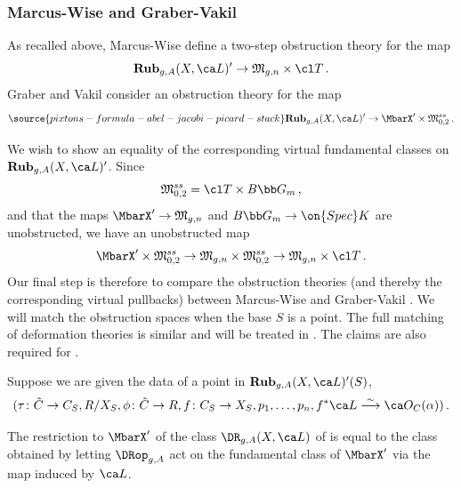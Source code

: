 \subsubsection{Marcus-Wise and Graber-Vakil}\label{mwgv}


As recalled above, Marcus-Wise define a two-step obstruction theory for the map
\begin{equation*}
\cat{Rub}_{g,A}(X, \ca L)' \to \frak M_{g,n} \times \cl T\,.
\end{equation*}
Graber and Vakil consider an obstruction theory for the map
\begin{equation} \label{vrrt}
\source{pixtons-formula-abel-jacobi-picard-stack}
\cat{Rub}_{g,A}(X, \ca L)' \to \MbarX' \times \frak M_{0,2}^{ss}\, .
\end{equation}

We wish to show an equality of the corresponding virtual fundamental classes on $\cat{Rub}_{g,A}(X, \ca L)'$. Since $$\frak M_{0,2}^{ss} = \cl T \times B\bb G_m\, ,$$ and that the maps $\MbarX' \to \frak M_{g,n}$ and $B \bb G_m \to \on{Spec} \field$ are unobstructed, we have an unobstructed map
$$ \MbarX' \times \frak M_{0,2}^{ss} \to \frak M_{g,n} \times \frak M_{0,2}^{ss} \to \frak M_{g,n} \times \cl T\, .$$
Our final step is therefore to compare the obstruction theories (and thereby the corresponding virtual pullbacks) between Marcus-Wise and Graber-Vakil \cite{Graber2005Relative-virtua,Li2002A-degeneration}.
We will match the obstruction spaces when the base $S$ is a point.
The full matching of deformation theories is similar and will be treated in \cite{PW}.
The claims are also required for \cite{Marcus2017Logarithmic-com}.

Suppose we are given the data of a point in $\cat{Rub}_{g,A}(X, \ca L)'(S)$,
\begin{equation}
(\tau\colon \tilde C \to C_S, \R/X_S, \phi\colon \tilde C \to \R, f\colon C_S \to X_S, p_1, \dots, p_n, f^*\ca L \isom \ca O_C(\alpha))\, .
\end{equation}

\begin{proposition}
\notready\label{prop:vfc_comparison_summary}
The restriction to $\MbarX'$ of the class $\DR_{g,A}(X, \ca L)$ of \cite{Janda2018Double-ramifica} is equal to the class obtained by letting $\DRop_{g,A}$ act on the fundamental class of $\MbarX'$ via the map induced by $\ca L$.
\end{proposition}



